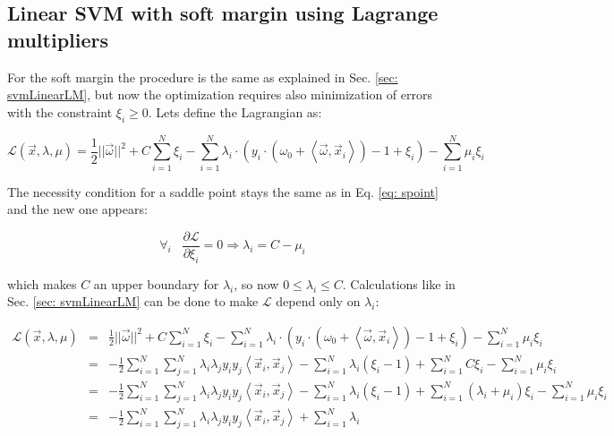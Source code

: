 \subsection{Linear SVM with soft margin using Lagrange multipliers}
\label{sec: svmLinearSoftLM}

For the soft margin the procedure is the same as explained in Sec. \ref{sec: svmLinearLM}, but now the optimization requires also minimization of errors with the constraint $\xi_i \geq 0$. Lets define the Lagrangian as:

\begin{equation} 
  \mathcal{L} (\vec x, \lambda, \mu) = \frac{1}{2}||\vec\omega||^2 + C\sum_{i=1}^N\xi_i - \sum_{i=1}^N \lambda_i \cdot \left(y_i \cdot \left(\omega_0 + \left<\vec\omega, \vec x_i\right>\right) - 1 + \xi_i\right) - \sum_{i=1}^N\mu_i\xi_i
  \label{eq: svmSoftL}
\end{equation}

The necessity condition for a saddle point stays the same as in Eq. \ref{eq: spoint} and the new one appears:

\begin{equation}
 \forall_i \hspace{10pt} \frac{\partial\mathcal{L}}{\partial\xi_i} = 0 \Rightarrow \lambda_i = C - \mu_i
 \label{eq: lambdamu}
\end{equation}

which makes $C$ an upper boundary for $\lambda_i$, so now $0 \leq \lambda_i \leq C$. Calculations like in Sec. \ref{sec: svmLinearLM} can be done to make $\mathcal{L}$ depend only on $\lambda_i$:

\begin{eqnarray}
  \mathcal{L} (\vec x, \lambda, \mu) & = & \frac{1}{2}||\vec\omega||^2 + C\sum_{i=1}^N\xi_i - \sum_{i=1}^N \lambda_i \cdot \left(y_i \cdot \left(\omega_0 + \left<\vec\omega, \vec x_i\right>\right) - 1 + \xi_i\right) - \sum_{i=1}^N\mu_i\xi_i \nonumber \\
  & = & -\frac{1}{2}\sum_{i=1}^N\sum_{j=1}^N\lambda_i\lambda_jy_iy_j\left<\vec x_i, \vec x_j\right> - \sum_{i=1}^{N}\lambda_i (\xi_i - 1) + \sum_{i=1}^NC\xi_i - \sum_{i=1}^N\mu_i\xi_i \nonumber \\
  & = & -\frac{1}{2}\sum_{i=1}^N\sum_{j=1}^N\lambda_i\lambda_jy_iy_j\left<\vec x_i, \vec x_j\right> - \sum_{i=1}^{N}\lambda_i (\xi_i - 1) + \sum_{i=1}^N(\lambda_i + \mu_i)\xi_i - \sum_{i=1}^N\mu_i\xi_i \nonumber \\
  & = & -\frac{1}{2}\sum_{i=1}^N\sum_{j=1}^N\lambda_i\lambda_jy_iy_j\left<\vec x_i, \vec x_j\right> + \sum_{i=1}^{N}\lambda_i
\end{eqnarray}

